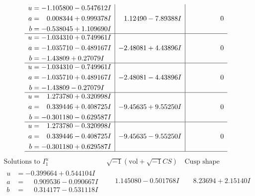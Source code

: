 \documentclass[1p]{elsarticle_modified}
\theoremstyle{definition}
\newcommand{\I}{\sqrt{-1}}
\begin{document}
$$\begin{array}{c|c|c}
\begin{aligned}
u &= -1.105800 - 0.547612 I \\
a &= \phantom{-}0.008344 + 0.999378 I \\
b &= -0.538045 + 1.109690 I\end{aligned}
 & \phantom{-}1.12490 - 7.89388 I & \phantom{-0.000000 } 0 \\ \hline\begin{aligned}
u &= -1.034310 + 0.749961 I \\
a &= -1.035710 - 0.489167 I \\
b &= -1.43809 + 0.27079 I\end{aligned}
 & -2.48081 + 4.43896 I & \phantom{-0.000000 } 0 \\ \hline\begin{aligned}
u &= -1.034310 - 0.749961 I \\
a &= -1.035710 + 0.489167 I \\
b &= -1.43809 - 0.27079 I\end{aligned}
 & -2.48081 - 4.43896 I & \phantom{-0.000000 } 0 \\ \hline\begin{aligned}
u &= \phantom{-}1.273780 + 0.320998 I \\
a &= \phantom{-}0.339446 + 0.408725 I \\
b &= -0.301180 - 0.629587 I\end{aligned}
 & -9.45635 + 9.55250 I & \phantom{-0.000000 } 0 \\ \hline\begin{aligned}
u &= \phantom{-}1.273780 - 0.320998 I \\
a &= \phantom{-}0.339446 - 0.408725 I \\
b &= -0.301180 + 0.629587 I\end{aligned}
 & -9.45635 - 9.55250 I & \phantom{-0.000000 } 0\\
 \hline 
 \end{array}$$\newpage$$\begin{array}{c|c|c}  
\text{Solutions to }I^u_{1}& \I (\text{vol} + \sqrt{-1}CS) & \text{Cusp shape}\\
 \hline 
\begin{aligned}
u &= -0.399664 + 0.544104 I \\
a &= \phantom{-}0.909536 - 0.090667 I \\
b &= \phantom{-}0.314177 - 0.531118 I\end{aligned}
 & \phantom{-}1.145080 - 0.501768 I & \phantom{-}8.23694 + 2.15140 I \\ \hline\begin{aligned}

\end{aligned}
\end{array}$$
\end{document}
